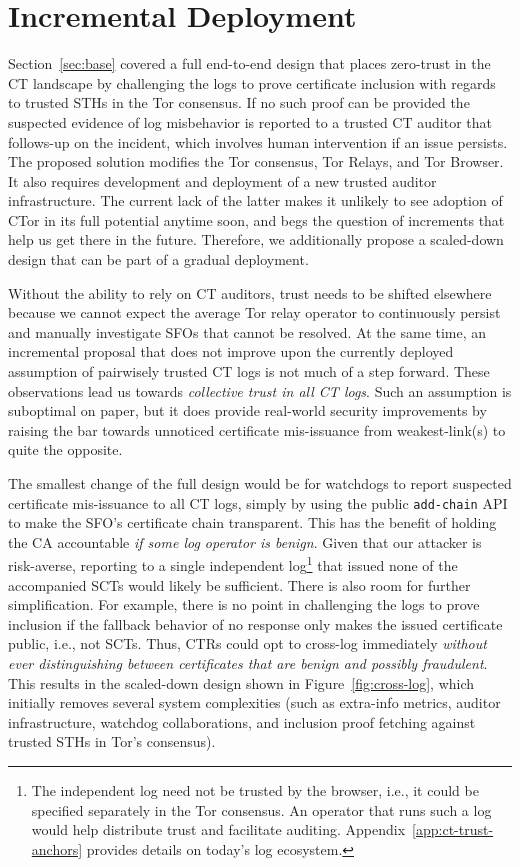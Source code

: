 \section{Incremental Deployment} \label{sec:incremental}
Section~\ref{sec:base} covered a full end-to-end design that places zero-trust
in the CT landscape by challenging the logs to prove certificate inclusion with
regards to trusted STHs in the Tor consensus.  If no such proof can be provided
the suspected evidence of log misbehavior is reported to a trusted CT auditor
that follows-up on the incident, which involves human intervention if an issue
persists.  The proposed solution modifies the Tor consensus, Tor Relays, and Tor
Browser.  It also requires development and deployment of a new trusted auditor
infrastructure.  The current lack of the latter makes it unlikely to see
adoption of CTor in its full potential anytime soon, and begs the question of
increments that help us get there in the future.  Therefore, we additionally
propose a scaled-down design that can be part of a gradual deployment.

Without the ability to rely on CT auditors, trust needs to be shifted elsewhere
because we cannot expect the average Tor relay operator to continuously persist
and manually investigate SFOs that cannot be resolved.  At the same time, an
incremental proposal that does not improve upon the currently deployed
assumption of pairwisely trusted CT logs is not much of a step forward.
These observations lead us towards
	\emph{collective trust in all CT logs}.
Such an assumption is suboptimal on paper, but it does provide real-world
security improvements by raising the bar towards unnoticed certificate
mis-issuance from weakest-link(s) to quite the opposite.

The smallest change of the full design would be for watchdogs to report
suspected certificate mis-issuance to all CT logs, simply by using the public
\texttt{add-chain} API to make the SFO's certificate chain transparent.  This
has the benefit of holding the CA accountable \emph{if some log operator is
benign}.  Given that our attacker is risk-averse, reporting to a single
independent log\footnote{%
	The independent log need not be trusted by the browser, i.e., it could be
	specified separately in the Tor consensus.  An operator that runs such a
	log would help distribute trust and facilitate auditing.
	Appendix~\ref{app:ct-trust-anchors} provides details on today's log
	ecosystem.
} that issued none of the accompanied SCTs would likely be sufficient.  There is
also room for further simplification.  For example, there is no point in
challenging the logs to prove inclusion if the fallback behavior of no response
only makes the issued certificate public, i.e., not SCTs.  Thus, CTRs could opt
to cross-log immediately \emph{without ever distinguishing between certificates
that are benign and possibly fraudulent}.  This results in the scaled-down
design shown in Figure~\ref{fig:cross-log}, which initially removes several
system complexities (such as extra-info metrics, auditor infrastructure,
watchdog collaborations, and inclusion proof fetching against trusted STHs in
Tor's consensus).

